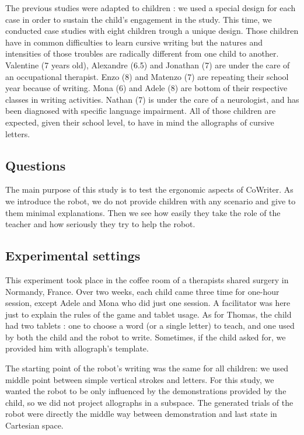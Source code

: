 \documentclass{sig-alternate}
\begin{document}
The previous studies were adapted to children : we used a special
design for each case in order to sustain the child's engagement in the study.
This time, we conducted case studies with eight children trough a unique
design. Those children have in common difficulties to learn
cursive writing but the natures and intensities of those troubles are radically
different from one child to another. Valentine (7 years old), Alexandre (6.5) and
Jonathan (7) are under the care of an
occupational therapist. Enzo (8) and Matenzo (7) are repeating their school year
because of writing. Mona (6) and Adele (8) are bottom of their respective
classes in writing activities. Nathan (7) is under the care of a neurologist, and
has been diagnosed with specific language impairment. All of those children are
expected, given their school level, to have in mind the allographs of
cursive letters. 

\subsection{Questions}

The main purpose of this study is to test the ergonomic aspects of CoWriter. As we
introduce the robot, we do not
provide children with any scenario and give to them minimal explanations. Then
we see how easily they take the role of the teacher and how seriously they try to help the robot.

\subsection{Experimental settings}

This experiment took place in the coffee room of a therapists shared surgery
in Normandy, France. Over two weeks, each child came three time for one-hour
session, except Adele and Mona who did just one session. A facilitator was here
just to explain the rules of the game and tablet usage. As for Thomas, the child
had two tablets : one to choose a word (or a single letter) to teach, and one
used by both the child and the robot to write. Sometimes, if the child asked for,
we provided him with allograph's template. 

The starting point of the robot's writing was the same for all children: we
used middle point between simple vertical strokes and letters. For this study,
we wanted the robot to be only influenced by the demonstrations provided by the
child, so we did not project allographs in a subspace. The generated
trials of the robot were directly the middle way between demonstration and
last state in Cartesian space. 
\end{document}
